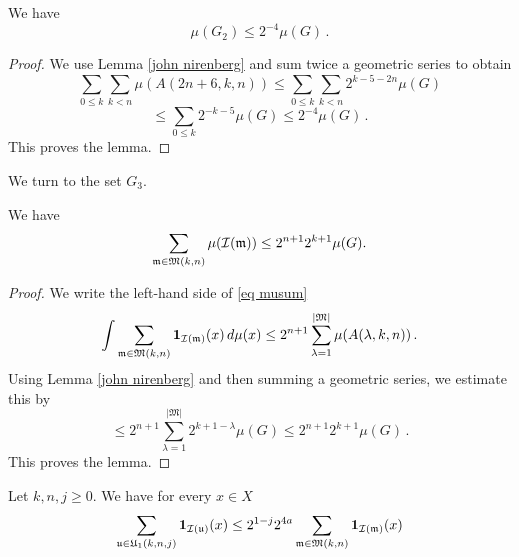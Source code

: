 {\begin{lemma}\label{second exception}
We have
\begin{equation}
    \mu(G_2)\le 2^{-4} \mu(G)\, .
\end{equation}
\end{lemma}
\begin{proof}

We use Lemma \ref{john nirenberg} and sum twice a geometric series
to obtain
\begin{equation}
    \sum_{0\le  k}\sum_{k< n}
\mu(A(2n+6,k,n))\le \sum_{0\le  k}\sum_{k< n} 2^{k-5-2n}\mu(G)
\end{equation}
\begin{equation}
   \le \sum_{0\le  k} 2^{-k-5}\mu(G)\le 2^{-4}\mu(G)\, .
\end{equation}
This proves the lemma.
\end{proof}


We turn to the set $G_3$.

\begin{lemma}\label{top tiles}
    We have
    \begin{equation}\label{eq musum}
        \sum_{\mathfrak{m} \in \mathfrak{M}(k,n)} \mu(\sc(\mathfrak{m}))\le 2^{n+1}2^{k+1}\mu(G).
    \end{equation}
\end{lemma}
\begin{proof}
    We write the left-hand side of \eqref{eq musum}
\begin{equation}
    \int \sum_{\mathfrak{m} \in \mathfrak{M}(k,n)} \mathbf{1}_{\sc(\mathfrak{m})}(x) \, d\mu(x) \le
2^{n+1} \sum_{\lambda=1}^{|\mathfrak{M}|}\mu(A(\lambda, k,n))\,.
\end{equation}
Using Lemma \ref{john nirenberg}
and then summing a geometric series, we estimate this by
\begin{equation}
    \le
2^{n+1}\sum_{\lambda=1}^{|\mathfrak{M}|}
2^{k+1-\lambda}\mu(G)
\le
2^{n+1}2^{k+1}\mu(G)\, .
\end{equation}
This proves the lemma.
\end{proof}


\begin{lemma}\label{tree count}
Let $k,n,j\ge 0$. We have for every $x\in X$
\begin{equation}
    \sum_{\fu\in \fU_1(k,n,j)} \mathbf{1}_{\sc(\fu)}(x)
    \le 2^{1-j}
    2^{4a} \sum_{\mathfrak{m}\in \mathfrak{M}(k,n)}
     \mathbf{1}_{\sc(\mathfrak{m})}(x)
\end{equation}
\end{lemma}

}
